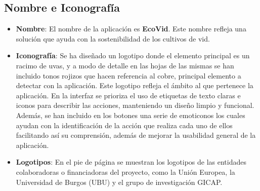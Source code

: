 \subsection{Nombre e Iconografía}
\begin{itemize}
    \item \textbf{Nombre}: El nombre de la aplicación es \textbf{EcoVid}. Este nombre refleja una solución que ayuda con la sostenibilidad de los cultivos de vid.

    \item \textbf{Iconografía}: Se ha diseñado un logotipo donde el elemento principal es un racimo de uvas, y a modo de detalle en las hojas de las mismas se han incluido tonos rojizos que hacen referencia al cobre, principal elemento a detectar con la aplicación. Este logotipo refleja el ámbito al que pertenece la aplicación.  En la interfaz se prioriza el uso de etiquetas de texto claras e iconos para describir las acciones, manteniendo un diseño limpio y funcional. Además, se han incluido en los botones una serie de emoticonos los cuales ayudan con la identificación de la acción que realiza cada uno de ellos facilitando así su comprensión, además de mejorar la usabilidad general de la aplicación.

    \item \textbf{Logotipos}: En el pie de página se muestran los logotipos de las entidades colaboradoras o financiadoras del proyecto, como la Unión Europea, la Universidad de Burgos (UBU) y el grupo de investigación GICAP.
\end{itemize}
